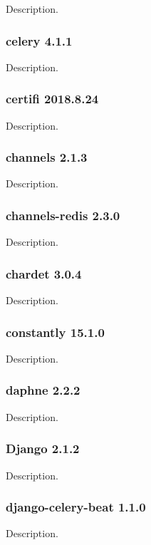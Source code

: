 Description.

\subsubsection{celery 4.1.1}

Description.

\subsubsection{certifi 2018.8.24}

Description.

\subsubsection{channels 2.1.3}

Description.

\subsubsection{channels-redis 2.3.0}

Description.

\subsubsection{chardet 3.0.4}

Description.

\subsubsection{constantly 15.1.0}

Description.

\subsubsection{daphne 2.2.2}

Description.

\subsubsection{Django 2.1.2}

Description.

\subsubsection{django-celery-beat 1.1.0}

Description.

